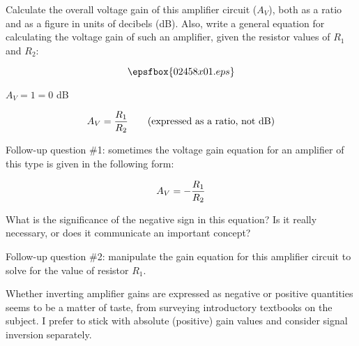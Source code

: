 

Calculate the overall voltage gain of this amplifier circuit ($A_V$), both as a ratio and as a figure in units of decibels (dB).  Also, write a general equation for calculating the voltage gain of such an amplifier, given the resistor values of $R_1$ and $R_2$:

$$\epsfbox{02458x01.eps}$$







$A_V = 1 = 0$ dB 

$$A_V = {R_1 \over R_2} \hbox{\hskip 20pt (expressed as a ratio, not dB)}$$

\vskip 10pt

Follow-up question \#1: sometimes the voltage gain equation for an amplifier of this type is given in the following form:

$$A_V = -{R_1 \over R_2}$$

What is the significance of the negative sign in this equation?  Is it really necessary, or does it communicate an important concept?

\vskip 10pt

Follow-up question \#2: manipulate the gain equation for this amplifier circuit to solve for the value of resistor $R_1$.







Whether inverting amplifier gains are expressed as negative or positive quantities seems to be a matter of taste, from surveying introductory textbooks on the subject.  I prefer to stick with absolute (positive) gain values and consider signal inversion separately.




